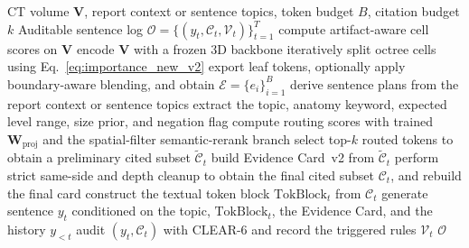 \begin{algorithm}[t]
\caption{\method{} with \textsc{CLEAR}-6}
\label{alg:method}
\small
\begin{algorithmic}[1]
\Require CT volume $\mathbf{V}$, report context or sentence topics, token budget $B$, citation budget $k$
\Ensure Auditable sentence log $\mathcal{O}=\{(y_t,\mathcal{C}_t,\mathcal{V}_t)\}_{t=1}^{T}$
\State compute artifact-aware cell scores on $\mathbf{V}$
\State encode $\mathbf{V}$ with a frozen 3D backbone
\State iteratively split octree cells using Eq.~\eqref{eq:importance_new_v2}
\State export leaf tokens, optionally apply boundary-aware blending, and obtain
$\mathcal{E}=\{e_i\}_{i=1}^{B}$
\State derive sentence plans from the report context or sentence topics
    \State extract the topic, anatomy keyword, expected level range, size prior, and negation flag
    \State compute routing scores with trained $\mathbf{W}_{\mathrm{proj}}$ and the
    spatial-filter semantic-rerank branch
    \State select top-$k$ routed tokens to obtain a preliminary cited subset
    $\widetilde{\mathcal{C}}_t$
    \State build Evidence Card~v2 from $\widetilde{\mathcal{C}}_t$
    \State perform strict same-side and depth cleanup to obtain the final cited subset
    $\mathcal{C}_t$, and rebuild the final card
    \State construct the textual token block $\mathrm{TokBlock}_t$ from $\mathcal{C}_t$
    \State generate sentence $y_t$ conditioned on the topic, $\mathrm{TokBlock}_t$,
    the Evidence Card, and the history $y_{<t}$
    \State audit $(y_t,\mathcal{C}_t)$ with \textsc{CLEAR}-6 and record the triggered rules
    $\mathcal{V}_t$
\EndFor
\State \Return $\mathcal{O}$
\end{algorithmic}
\end{algorithm}
